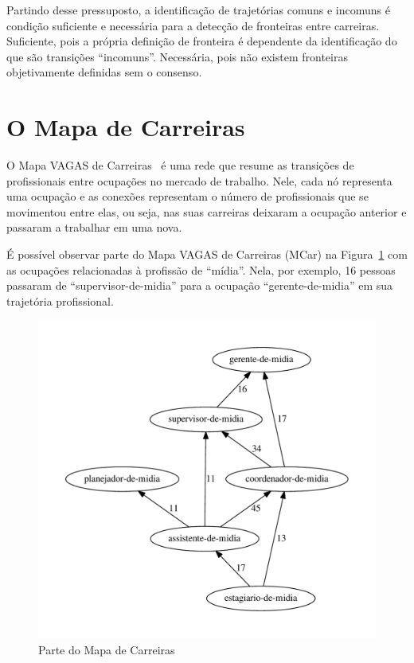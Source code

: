 \documentclass[
  article,
  11pt,
  a4paper,
  english,
  brazil,
  sumario=tradicional]{abntex2}
\begin{document}
Partindo desse pressuposto, a identificação de trajetórias comuns e incomuns é condição suficiente e necessária para a detecção de fronteiras entre carreiras. Suficiente, pois a própria definição de fronteira é dependente da identificação do que são transições \enquote{incomuns}. Necessária, pois não existem fronteiras objetivamente definidas sem o consenso.

\section{O Mapa de Carreiras} \label{sec:mapa}

O Mapa VAGAS de Carreiras~\cite{VAGAS_Tecnologia2015-yv} é uma rede que resume as transições de profissionais entre ocupações no mercado de trabalho. Nele, cada nó representa uma ocupação e as conexões representam o número de profissionais que se movimentou entre elas, ou seja, nas suas carreiras deixaram a ocupação anterior e passaram a trabalhar em uma nova.

É possível observar parte do Mapa VAGAS de Carreiras (MCar) na Figura~\ref{fig:ex-mapa-midia} com as ocupações relacionadas à profissão de \enquote{mídia}. Nela, por exemplo, 16 pessoas passaram de \enquote{supervisor-de-midia} para a ocupação \enquote{gerente-de-midia} em sua trajetória profissional.

\begin{figure}[ht]
  \centering
  \includegraphics[scale=0.6]{cluster_23.pdf}
  \caption{Parte do Mapa de Carreiras}
  \label{fig:ex-mapa-midia}
\end{figure}
\end{document}
